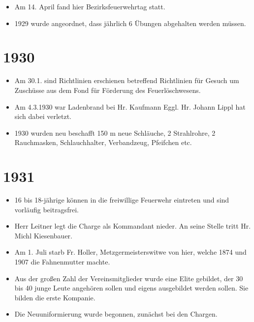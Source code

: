 \documentclass[12pt,a4paper]{book}
\begin{document}
\begin{itemize}
\item Am 14. April fand hier Bezirksfeuerwehrtag statt.

\item 1929 wurde angeordnet, dass jährlich 6 Übungen abgehalten werden
müssen.
\end{itemize}

\section*{1930}

\begin{itemize}
\item Am 30.1. sind Richtlinien erschienen betreffend Richtlinien für
Gesuch um Zuschüsse aus dem Fond für Förderung des Feuerlöschwesens.

\item Am 4.3.1930 war Ladenbrand bei Hr. Kaufmann Eggl. Hr. Johann Lippl
hat sich dabei verletzt.

\item 1930 wurden neu beschafft 150 m neue Schläuche, 2 Strahlrohre, 2
Rauchmasken, Schlauchhalter, Verbandzeug, Pfeifchen etc.
\end{itemize}

\section*{1931}

\begin{itemize}
\item 16 bis 18-jährige können in die freiwillige Feuerwehr eintreten
und sind vorläufig beitragsfrei.

\item Herr Leitner legt die Charge als Kommandant nieder. An seine
Stelle tritt Hr. Michl Kiesenbauer.

\item Am 1. Juli starb Fr. Holler, Metzgermeisterswitwe von hier, welche
1874 und 1907 die Fahnenmutter machte.

\item Aus der großen Zahl der Vereinsmitglieder wurde eine Elite
gebildet, der 30 bis 40 junge Leute angehören sollen und eigens
ausgebildet werden sollen. Sie bilden die erste Kompanie.

\item Die Neuuniformierung wurde begonnen, zunächst bei den Chargen.
\end{itemize}
\end{document}
